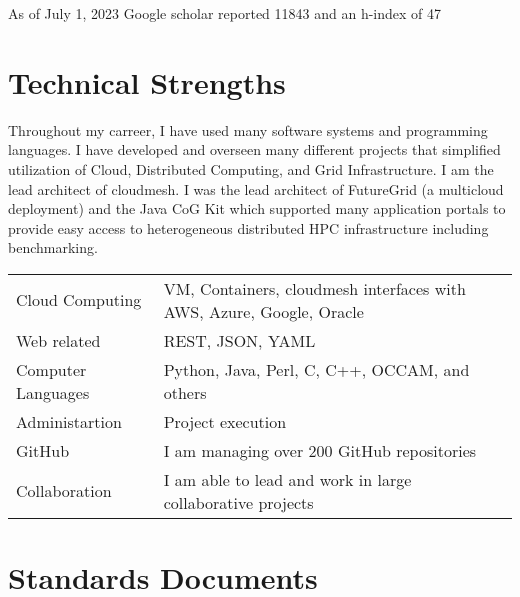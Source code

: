 \documentclass{article}
\begin{document}
As of July 1, 2023 Google scholar reported 11843 and an h-index of 47



\section{Technical Strengths}

Throughout my carreer, I have used many software systems and
programming languages.  I have developed and overseen many different
projects that simplified utilization of Cloud, Distributed Computing,
and Grid Infrastructure. I am the lead architect of cloudmesh. I was
the lead architect of FutureGrid (a multicloud deployment) and the
Java CoG Kit which supported many application portals to provide easy
access to heterogeneous distributed HPC infrastructure including benchmarking.

\bigskip

\begin{tabular}{ll}
Cloud Computing & VM, Containers, cloudmesh interfaces with AWS, Azure, Google, Oracle\\
Web related & REST, JSON, YAML \\
Computer Languages & Python, Java, Perl, C, C++, OCCAM, and others\\
Administartion & Project execution\\
GitHub         & I am managing over 200 GitHub repositories\\
Collaboration & I am able to lead and work in large collaborative projects\\
\end{tabular}


\section{Standards Documents}

\begin{refsegment}

  \nocite{las-2020-nist-bigdata}
  \nocite{las-2019-nist}  
  \nocite{las-2019-nist-vol8}
  \nocite{las-2001-gosv3}
  \nocite{las-2001-gosv2}  

\end{refsegment}
\end{document}
